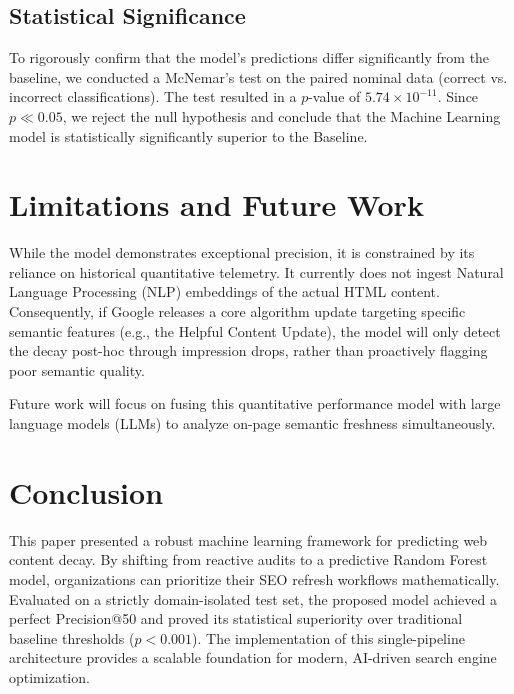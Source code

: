 \documentclass[conference]{IEEEtran}
\begin{document}
\subsection{Statistical Significance}
To rigorously confirm that the model's predictions differ significantly from the baseline, we conducted a McNemar's test on the paired nominal data (correct vs. incorrect classifications). The test resulted in a $p$-value of $5.74 \times 10^{-11}$. Since $p \ll 0.05$, we reject the null hypothesis and conclude that the Machine Learning model is statistically significantly superior to the Baseline.

\section{Limitations and Future Work}
While the model demonstrates exceptional precision, it is constrained by its reliance on historical quantitative telemetry. It currently does not ingest Natural Language Processing (NLP) embeddings of the actual HTML content. Consequently, if Google releases a core algorithm update targeting specific semantic features (e.g., the Helpful Content Update), the model will only detect the decay post-hoc through impression drops, rather than proactively flagging poor semantic quality.

Future work will focus on fusing this quantitative performance model with large language models (LLMs) to analyze on-page semantic freshness simultaneously.

\section{Conclusion}
This paper presented a robust machine learning framework for predicting web content decay. By shifting from reactive audits to a predictive Random Forest model, organizations can prioritize their SEO refresh workflows mathematically. Evaluated on a strictly domain-isolated test set, the proposed model achieved a perfect Precision@50 and proved its statistical superiority over traditional baseline thresholds ($p < 0.001$). The implementation of this single-pipeline architecture provides a scalable foundation for modern, AI-driven search engine optimization.
\end{document}
